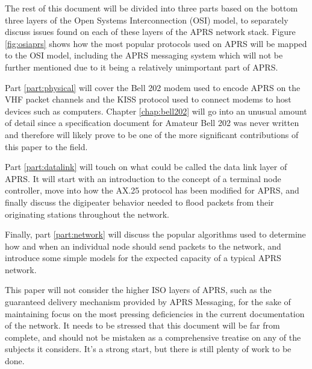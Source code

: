 The rest of this document will be divided into three parts based on the
bottom three layers of the Open Systems Interconnection (OSI) model,
to separately discuss issues found on each of these layers of the APRS network stack.
Figure \ref{fig:osiaprs} shows how the most popular protocols used on APRS
will be mapped to the OSI model, including the APRS messaging system which
will not be further mentioned due to it being a relatively unimportant part of APRS.

Part \ref{part:physical} will cover the Bell 202 modem used to encode APRS on
the VHF packet channels and the KISS protocol used to connect modems to
host devices such as computers. Chapter \ref{chap:bell202} will go into an
unusual amount of detail since a specification document for Amateur Bell 202
was never written and therefore will likely prove to be one of the more significant
contributions of this paper to the field.

Part \ref{part:datalink} will touch on what could be called the data link layer
of APRS. It will start with an introduction to the concept of a terminal
node controller, move into how the AX.25 protocol has been modified for APRS, and
finally discuss the digipeater behavior needed to flood packets from their
originating stations throughout the network.

Finally, part \ref{part:network} will discuss the popular algorithms used to 
determine how and when an individual node should send packets to the network,
and introduce some simple models for the 
expected capacity of a typical APRS network.

This paper will not consider the higher ISO layers of APRS,
such as the guaranteed delivery mechanism provided by APRS Messaging,
for the sake of maintaining focus on the most pressing deficiencies
in the current documentation of the network.
It needs to be stressed that this document will be far from complete,
and should not be mistaken as a comprehensive treatise on any of the
subjects it considers.
It's a strong start, but there is still plenty of work to be done.
